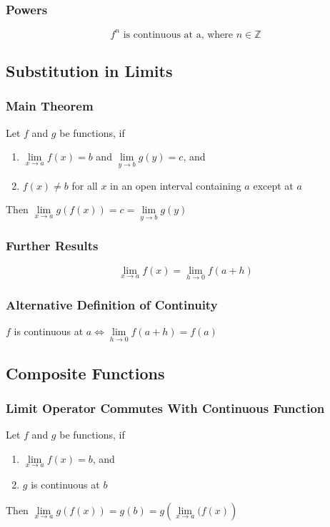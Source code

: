 \documentclass[../ma2002_notes.tex]{subfiles}
\begin{document}
\subsubsection{Powers}
\[f^n\text{ is continuous at a, where }n\in\mathbb{Z}\]

\subsection{Substitution in Limits}
\subsubsection{Main Theorem}
Let \(f\) and \(g\) be functions, if
\begin{enumerate}
	\item \(\lim\limits_{x\to a}f(x)=b\) and \(\lim\limits_{y\to b}g(y)=c\), and
	\item \(f(x)\ne b\) for all \(x\) in an open interval containing \(a\) except at \(a\)
\end{enumerate}
Then \(\lim\limits_{x\to a}g(f(x))=c=\lim\limits_{y\to b}g(y)\)

\subsubsection{Further Results}
\[\lim_{x\to a}f(x) = \lim_{h\to 0}f(a+h)\]

\subsubsection{Alternative Definition of Continuity}
\(f\) is continuous at \(a\iff\lim\limits_{h\to 0}f(a+h)=f(a)\)

\subsection{Composite Functions}
\subsubsection{Limit Operator Commutes With Continuous Function}
Let \(f\) and \(g\) be functions, if
\begin{enumerate}
	\item \(\lim\limits_{x\to a}f(x)=b\), and
	\item \(g\) is continuous at \(b\)
\end{enumerate}
Then \(\lim\limits_{x\to a}g(f(x))=g(b)=g\left(\lim\limits_{x\to a}(f(x)\right)\)
\end{document}
